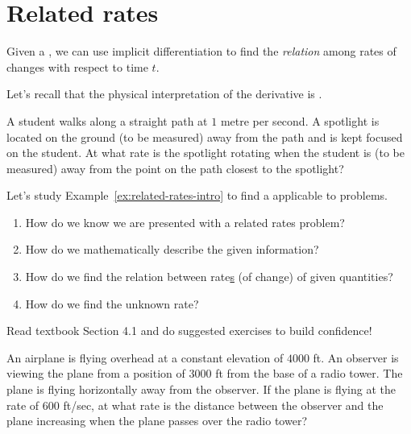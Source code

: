 \documentclass[../main.tex]{subfiles}
\begin{document}
 \section{Related rates}
Given a , we can use implicit differentiation  to find the \emph{relation} among rates of changes with respect to time \(t\).

Let's recall that the physical interpretation of the derivative is .
\begin{example} \label{ex:related-rates-intro}
  A student walks along a straight path at \(1\) metre per second.  A spotlight is located on the ground (to be measured) \underline{\hspace{1in}} away from the path and is kept focused on the student. At what rate is the spotlight rotating when the student is (to be measured) \underline{\hspace{1in}} away from the point on the path closest to the spotlight?
\end{example}


Let's study Example~\ref{ex:related-rates-intro} to find a  applicable to   problems. 
\begin{enumerate}
  \item How do we know we are presented with a related rates problem?


  \item How do we mathematically describe the given information?


  \item How do we find the relation between rate\underline{s} (of change) of given quantities?


  \item How do we find the unknown rate?

\end{enumerate}

\faStar{} Read textbook Section 4.1 and do suggested exercises to build confidence!

\clearpage
\begin{example}
  An airplane is flying overhead at a constant elevation of \(4000\) ft. An observer is viewing the plane from a position of \(3000\) ft from the base of a radio tower. The plane is flying horizontally away from the observer. If the plane is flying at the rate of \(600\) ft/sec, at what rate is the distance between the observer and the plane increasing when the plane passes over the radio tower?

\end{example}
\clearpage
\end{document}
